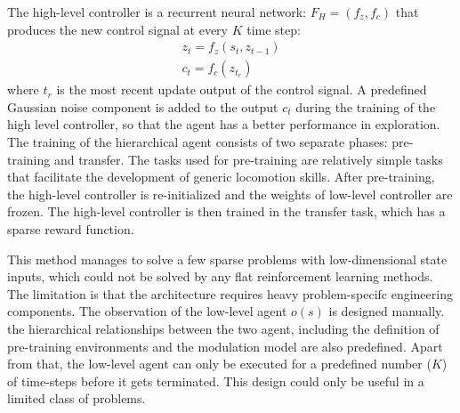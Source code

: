 The high-level controller is a recurrent neural network: $F_H = (f_z,f_c)$ that produces the new control signal at every $K$ time step:
\begin{align}
z_t = f_z(s_t,z_{t-1}) \\
c_t = f_c(z_{t_r})
\end{align}
where $t_r$ is the most recent update output of the control signal. A predefined Gaussian noise component is added to the output $c_t$ during the training of the high level controller, so that the agent has a better performance in exploration.
The training of the hierarchical agent consists of two separate phases: pre-training and transfer. The tasks used for pre-training are relatively simple tasks that facilitate the development of generic locomotion skills. After pre-training, the high-level controller is re-initialized and the weights of low-level controller are frozen. The high-level controller is then trained in the transfer task, which has a sparse reward function.

This method manages to solve a few sparse problems with low-dimensional state inputs, which could not be solved by any flat reinforcement learning methods. The limitation is that the architecture requires heavy problem-specifc engineering components. The observation of the low-level agent $o(s)$ is designed manually. the hierarchical relationships between the two agent, including the definition of pre-training environments and the modulation model are also predefined. Apart from that, the low-level agent can only be executed for a predefined number ($K$) of time-steps before it gets terminated. This design could only be useful in a limited class of problems.

